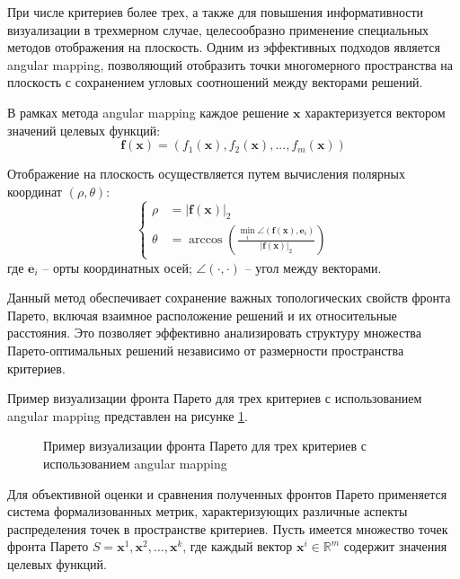 При числе критериев более трех, а также для повышения информативности визуализации
в трехмерном случае, целесообразно применение специальных методов отображения на плоскость.
Одним из эффективных подходов является angular mapping, позволяющий отобразить точки
многомерного пространства на плоскость с сохранением угловых соотношений между векторами решений.

В рамках метода angular mapping каждое решение $\mathbf{x}$ характеризуется вектором значений целевых функций:
\begin{equation}
	\mathbf{f}(\mathbf{x}) = (f_1(\mathbf{x}), f_2(\mathbf{x}), ..., f_m(\mathbf{x}))
\end{equation}

Отображение на плоскость осуществляется путем вычисления полярных координат $(\rho, \theta)$:
\begin{equation}
	\begin{cases}
		\rho   & = |\mathbf{f}(\mathbf{x})|_2                                                                                 \\
		\theta & = \arccos\left(\frac{\min_i \angle(\mathbf{f}(\mathbf{x}), \mathbf{e}_i)}{|\mathbf{f}(\mathbf{x})|_2}\right)
	\end{cases}
\end{equation}
где $\mathbf{e}_i$ -- орты координатных осей; $\angle(\cdot,\cdot)$ -- угол между векторами.

Данный метод обеспечивает сохранение важных топологических свойств фронта Парето, включая взаимное
расположение решений и их относительные расстояния. Это позволяет эффективно
анализировать структуру множества Парето-оптимальных решений независимо от размерности пространства критериев.

Пример визуализации фронта Парето для трех критериев с использованием angular mapping представлен на рисунке \ref{img4:pareto_front_angular_example}.

\begin{figure}[ht]
	\caption{Пример визуализации фронта Парето для трех критериев с использованием angular mapping}
	\label{img4:pareto_front_angular_example}
\end{figure}

Для объективной оценки и сравнения полученных фронтов Парето применяется система формализованных метрик,
характеризующих различные аспекты распределения точек в пространстве критериев. Пусть имеется множество точек
фронта Парето $S = {\mathbf{x}^1, \mathbf{x}^2, \dots, \mathbf{x}^k}$, где каждый вектор $\mathbf{x}^i \in \mathbb{R}^m$ содержит значения целевых функций.

